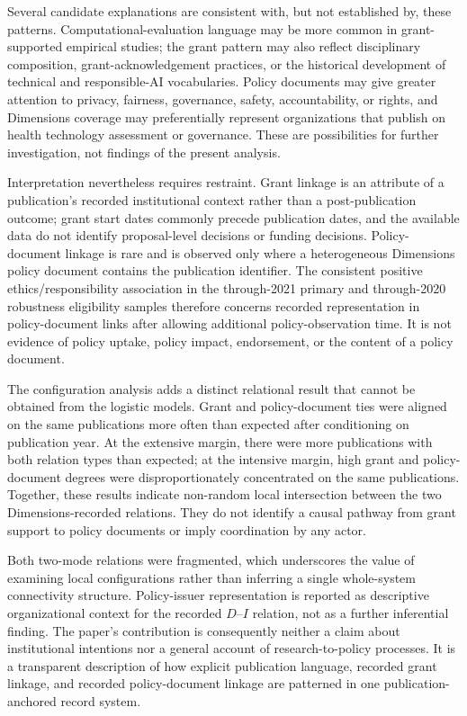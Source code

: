 \documentclass[12pt]{article}
\begin{document}
Several candidate explanations are consistent with, but not established by, these patterns. Computational-evaluation language may be more common in grant-supported empirical studies; the grant pattern may also reflect disciplinary composition, grant-acknowledgement practices, or the historical development of technical and responsible-AI vocabularies. Policy documents may give greater attention to privacy, fairness, governance, safety, accountability, or rights, and Dimensions coverage may preferentially represent organizations that publish on health technology assessment or governance. These are possibilities for further investigation, not findings of the present analysis.

Interpretation nevertheless requires restraint. Grant linkage is an attribute of a publication's recorded institutional context rather than a post-publication outcome; grant start dates commonly precede publication dates, and the available data do not identify proposal-level decisions or funding decisions. Policy-document linkage is rare and is observed only where a heterogeneous Dimensions policy document contains the publication identifier. The consistent positive ethics/responsibility association in the through-2021 primary and through-2020 robustness eligibility samples therefore concerns recorded representation in policy-document links after allowing additional policy-observation time. It is not evidence of policy uptake, policy impact, endorsement, or the content of a policy document.

The configuration analysis adds a distinct relational result that cannot be obtained from the logistic models. Grant and policy-document ties were aligned on the same publications more often than expected after conditioning on publication year. At the extensive margin, there were more publications with both relation types than expected; at the intensive margin, high grant and policy-document degrees were disproportionately concentrated on the same publications. Together, these results indicate non-random local intersection between the two Dimensions-recorded relations. They do not identify a causal pathway from grant support to policy documents or imply coordination by any actor.

Both two-mode relations were fragmented, which underscores the value of examining local configurations rather than inferring a single whole-system connectivity structure. Policy-issuer representation is reported as descriptive organizational context for the recorded $D$--$I$ relation, not as a further inferential finding. The paper's contribution is consequently neither a claim about institutional intentions nor a general account of research-to-policy processes. It is a transparent description of how explicit publication language, recorded grant linkage, and recorded policy-document linkage are patterned in one publication-anchored record system.
\end{document}
